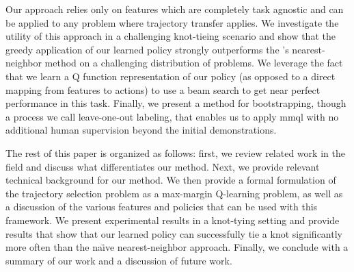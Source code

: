 Our approach relies only on features which are completely task 
agnostic and can be applied to any problem where trajectory transfer applies. 
We investigate the utility of this approach in a challenging knot-tieing scenario 
and show that the greedy application of our learned policy strongly outperforms the 
\citet{Schulmanetal_ISRR2013}'s nearest-neighbor method on a challenging distribution of 
problems. 
We leverage the fact that we learn a Q function representation of our policy (as 
opposed to a direct mapping from features to actions) to use a beam search to get 
near perfect performance in this task.
Finally, we present a method for bootstrapping, though a process we call leave-one-out labeling, that enables us to apply {\sc mmql} with no additional human supervision beyond the initial demonstrations.

The rest of this paper is organized as follows: first, we review related work in
the field and discuss what differentiates our method. Next, we provide relevant
technical background for our method. We then provide a formal formulation of the
trajectory selection problem as a max-margin Q-learning problem, as well as a
discussion of the various features and policies that can be used with this
framework. We present experimental results in a knot-tying setting and provide
results that show that our learned policy can successfully tie a knot
significantly more often than the na\"{\i}ve nearest-neighbor approach. Finally,
we conclude with a summary of our work and a discussion of future work.
